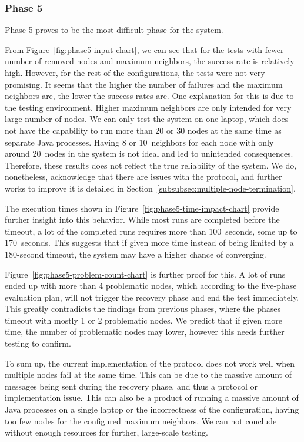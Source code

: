 \subsubsection{Phase 5}
\label{sec:phase-5-evaluation}

Phase 5 proves to be the most difficult phase for the system.

From Figure~\ref{fig:phase5-input-chart}, we can see that for the tests with fewer number of removed nodes and maximum
neighbors, the success rate is relatively high. However, for the rest of the configurations, the tests were not very
promising. It seems that the higher the number of failures and the maximum neighbors are, the lower the success rates
are. One explanation for this is due to the testing environment. Higher maximum neighbors are only intended for very
large number of nodes. We can only test the system on one laptop, which does not have the capability to run more than
20 or 30 nodes at the same time as separate Java processes. Having 8 or 10~neighbors for each node with only around
20~nodes in the system is not ideal and led to unintended consequences. Therefore, these results does not reflect the
true reliability of the system. We do, nonetheless, acknowledge that there are issues with the protocol, and further
works to improve it is detailed in Section~\ref{subsubsec:multiple-node-termination}.

The execution times shown in Figure~\ref{fig:phase5-time-impact-chart} provide further insight into this behavior.
While most runs are completed before the timeout, a lot of the completed runs requires more than 100~seconds, some up
to 170~seconds. This suggests that if given more time instead of being limited by a 180-second timeout, the system may
have a higher chance of converging.

Figure~\ref{fig:phase5-problem-count-chart} is further proof for this. A lot of runs ended up with more than 4
problematic nodes, which according to the five-phase evaluation plan, will not trigger the recovery phase and end the
test immediately. This greatly contradicts the findings from previous phases, where the phases timeout with mostly 1 or
2 problematic nodes. We predict that if given more time, the number of problematic nodes may lower, however this needs
further testing to confirm.

To sum up, the current implementation of the protocol does not work well when multiple nodes fail at the same time.
This can be due to the massive amount of messages being sent during the recovery phase, and thus a protocol or
implementation issue. This can also be a product of running a massive amount of Java processes on a single laptop or
the incorrectness of the configuration, having too few nodes for the configured maximum neighbors. We can not conclude
without enough resources for further, large-scale testing.

